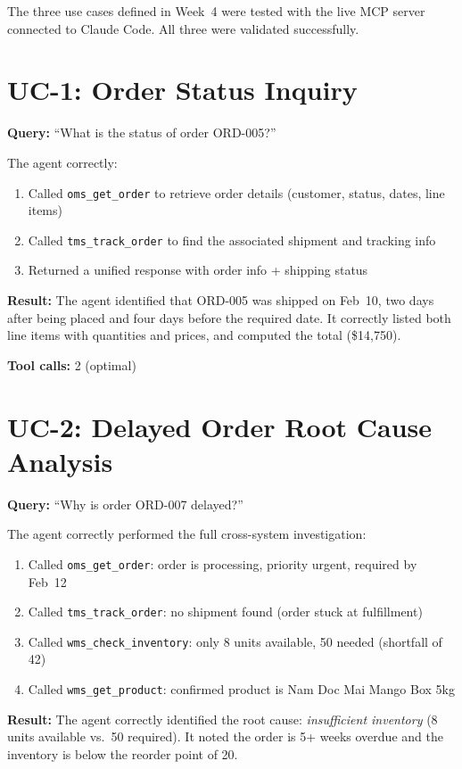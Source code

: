 \documentclass[12pt,a4paper]{report}
\begin{document}
The three use cases defined in Week~4 were tested with the live MCP server connected to Claude Code. All three were validated successfully.

\section{UC-1: Order Status Inquiry}

\textbf{Query:} ``What is the status of order ORD-005?''

The agent correctly:
\begin{enumerate}[itemsep=0.2em]
    \item Called \texttt{oms\_get\_order} to retrieve order details (customer, status, dates, line items)
    \item Called \texttt{tms\_track\_order} to find the associated shipment and tracking info
    \item Returned a unified response with order info + shipping status
\end{enumerate}

\textbf{Result:} The agent identified that ORD-005 was shipped on Feb~10, two days after being placed and four days before the required date. It correctly listed both line items with quantities and prices, and computed the total (\$14,750).

\textbf{Tool calls:} 2 (optimal)

\section{UC-2: Delayed Order Root Cause Analysis}

\textbf{Query:} ``Why is order ORD-007 delayed?''

The agent correctly performed the full cross-system investigation:
\begin{enumerate}[itemsep=0.2em]
    \item Called \texttt{oms\_get\_order}: order is processing, priority urgent, required by Feb~12
    \item Called \texttt{tms\_track\_order}: no shipment found (order stuck at fulfillment)
    \item Called \texttt{wms\_check\_inventory}: only 8 units available, 50 needed (shortfall of 42)
    \item Called \texttt{wms\_get\_product}: confirmed product is Nam Doc Mai Mango Box 5kg
\end{enumerate}

\textbf{Result:} The agent correctly identified the root cause: \textit{insufficient inventory} (8 units available vs.\ 50 required). It noted the order is 5+ weeks overdue and the inventory is below the reorder point of 20.
\end{document}
